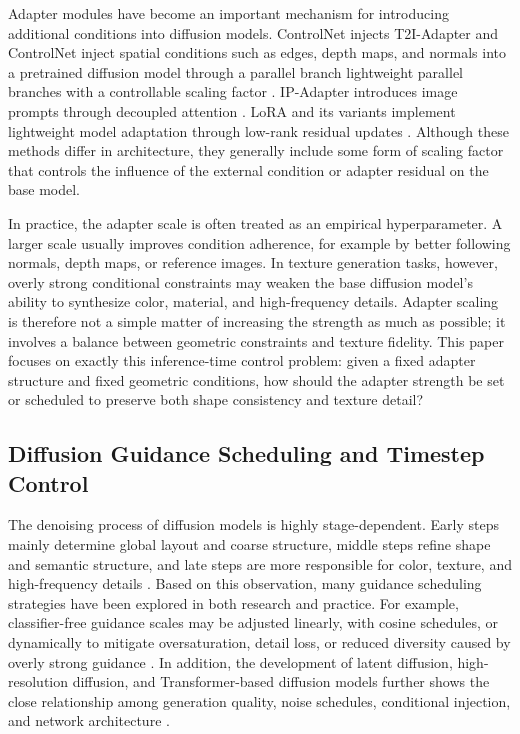 \documentclass[times,twocolumn,final]{elsarticle}
\providecommand{\DIFadd}[1]{{\protect\color{blue} \sf #1}} %
\providecommand{\DIFdel}[1]{{\protect\color{red} \scriptsize #1}} %
\providecommand{\DIFaddbegin}{} %
\providecommand{\DIFaddend}{} %
\providecommand{\DIFdelbegin}{} %
\providecommand{\DIFdelend}{} %
\newcommand{\DIFscaledelfig}{0.5}
\newlength{\DIFdelgraphicswidth} %
\newlength{\DIFdelgraphicsheight} %
\newcommand{\DIFaddincludegraphics}[2][]{{\color{blue}\fbox{\DIFOincludegraphics[#1]{#2}}}} %
\newcommand{\DIFdelincludegraphics}[2][]{%
\sbox{\DIFdelgraphicsbox}{\DIFOincludegraphics[#1]{#2}}%
\settoboxwidth{\DIFdelgraphicswidth}{\DIFdelgraphicsbox} %
\settoboxtotalheight{\DIFdelgraphicsheight}{\DIFdelgraphicsbox} %
\scalebox{\DIFscaledelfig}{%
\parbox[b]{\DIFdelgraphicswidth}{\usebox{\DIFdelgraphicsbox}\\[-\baselineskip] \rule{\DIFdelgraphicswidth}{0em}}\llap{\resizebox{\DIFdelgraphicswidth}{\DIFdelgraphicsheight}{%
\setlength{\unitlength}{\DIFdelgraphicswidth}%
\begin{picture}(1,1)%
\thicklines\linethickness{2pt} %
{\color[rgb]{1,0,0}\put(0,0){\framebox(1,1){}}}%
{\color[rgb]{1,0,0}\put(0,0){\line( 1,1){1}}}%
{\color[rgb]{1,0,0}\put(0,1){\line(1,-1){1}}}%
\end{picture}%
}\hspace*{3pt}}} %
} %
\DeclareRobustCommand{\DIFaddbegin}{\DIFOaddbegin \let\includegraphics\DIFaddincludegraphics} %
\DeclareRobustCommand{\DIFaddend}{\DIFOaddend \let\includegraphics\DIFOincludegraphics} %
\DeclareRobustCommand{\DIFdelbegin}{\DIFOdelbegin \let\includegraphics\DIFdelincludegraphics} %
\DeclareRobustCommand{\DIFdelend}{\DIFOaddend \let\includegraphics\DIFOincludegraphics} %
\begin{document}
Adapter modules have become an important mechanism for introducing additional conditions into diffusion models. \DIFdelbegin \DIFdel{ControlNet injects }\DIFdelend \DIFaddbegin \DIFadd{T2I-Adapter and ControlNet inject }\DIFaddend spatial conditions such as edges, depth maps, and normals into a pretrained diffusion model through \DIFdelbegin \DIFdel{a parallel branch \cite{zhang2023controlnet}}\DIFdelend \DIFaddbegin \DIFadd{lightweight parallel branches with a controllable scaling factor \cite{mou2023t2iadapter,zhang2023controlnet}}\DIFaddend . IP-Adapter introduces image prompts through decoupled attention \cite{ye2023ipadapter}. LoRA and its variants implement lightweight model adaptation through low-rank residual updates \cite{hu2022lora,liu2024dora,zhang2023adalora}. Although these methods differ in architecture, they generally include some form of scaling factor that controls the influence of the external condition or adapter residual on the base model.

In practice, the adapter scale is often treated as an empirical hyperparameter. A larger scale usually improves condition adherence, for example by better following normals, depth maps, or reference images. In texture generation tasks, however, overly strong conditional constraints may weaken the base diffusion model's ability to synthesize color, material, and high-frequency details. Adapter scaling is therefore not a simple matter of increasing the strength as much as possible; it involves a balance between geometric constraints and texture fidelity. This paper focuses on exactly this inference-time control problem: given a fixed adapter structure and fixed geometric conditions, how should the adapter strength be set or scheduled to preserve both shape consistency and texture detail?

\subsection{Diffusion Guidance Scheduling and Timestep Control}
\label{subsec:guidance}

The denoising process of diffusion models is highly stage-dependent. Early steps mainly determine global layout and coarse structure, middle steps refine shape and semantic structure, and late steps are more responsible for color, texture, and high-frequency details \cite{ho2020ddpm,song2021ddim}. Based on this observation, many guidance scheduling strategies have been explored in both research and practice. For example, classifier-free guidance scales may be adjusted linearly, with cosine schedules, or dynamically to mitigate oversaturation, detail loss, or reduced diversity caused by overly strong guidance \cite{ho2022cfg,castillo2023adaptive}. In addition, the development of latent diffusion, high-resolution diffusion, and Transformer-based diffusion models further shows the close relationship among generation quality, noise schedules, conditional injection, and network architecture \cite{rombach2022ldm,esser2024scaling,blackforestlabs2024flux,loshchilov2019decoupled,cherti2023reproducible,nichol2022glide,saharia2022photorealistic,peebles2023scalable}.
\end{document}
